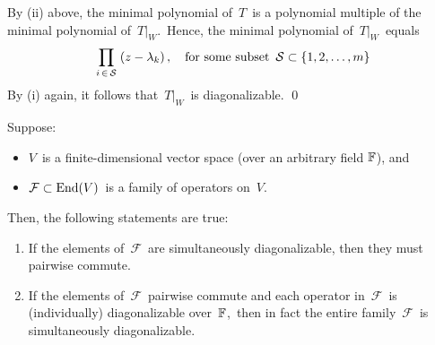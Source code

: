 \vskip 0.1cm
By (ii) above, the minimal polynomial of \,$T$\, is a polynomial multiple
of the minimal polynomial of \,$T\vert_{W}$.\,
Hence, the minimal polynomial of \,$T\vert_{W}$\, equals
\begin{equation*}
\underset{i\,\in\,\mathcal{S}}{\prod}\;(z - \lambda_{k})\,,
\quad
\textnormal{for some subset \,$\mathcal{S} \subset \{1,2,\ldots,m\}$}
\end{equation*}
By (i) again, it follows that \,$T\vert_{W}$\, is diagonalizable.
\qed


\vskip 0.5cm
\begin{proposition}
\label{SDiagonalizableEqualsCommuteAndDiagonalizable}
\mbox{}
\vskip -0.35cm
\noindent
Suppose:
\begin{itemize}
\item
    $V$\, is a finite-dimensional vector space (over an arbitrary field $\mathbb{F}$), and
\item
    $\mathcal{F} \subset \textnormal{End}(V)$\, is a family of operators on \,$V$.\,
\end{itemize}
Then, the following statements are true:
\begin{enumerate}
\item
    If the elements of \,$\mathcal{F}$\, are simultaneously diagonalizable,
    then they must pairwise commute.
\item
    If the elements of \,$\mathcal{F}$\, pairwise commute and
    each operator in \,$\mathcal{F}$\, is (individually) diagonalizable over \,$\mathbb{F}$,\,
    then in fact the entire family \,$\mathcal{F}$\, is simultaneously diagonalizable.
\end{enumerate}
\end{proposition}
\proof
